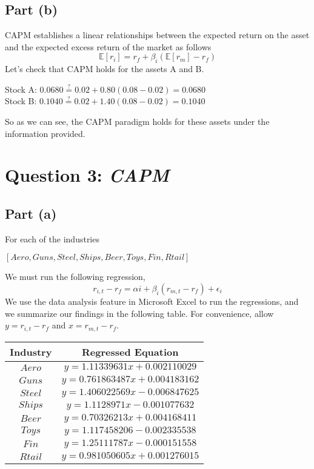 \documentclass[12pt]{article}
\begin{document}
	\subsection{Part (b)}
	
		CAPM establishes a linear relationships between the expected return on the asset and the expected excess return of the market as follows
		$$ \mathbb{E}[r_{i}] = r_{f} + \beta_{i}(\mathbb{E}[r_{m}] - r_{f}) $$
		Let's check that CAPM holds for the assets A and B.\\
		\begin{center}
		Stock A: $0.0680 \stackrel{?}{=} 0.02 + 0.80(0.08-0.02) = 0.0680$ \\ 
		Stock B: $0.1040 \stackrel{?}{=} 0.02 + 1.40(0.08-0.02) = 0.1040$
		\end{center}
		So as we can see, the CAPM paradigm holds for these assets under the information provided. 
		
\section{Question 3: \textit{CAPM}}

	\subsection{Part (a)}
		
		For each of the industries
		\begin{center}
			$[Aero, Guns, Steel, Ships, Beer, Toys, Fin, Rtail]$
		\end{center}
		We must run the following regression,
		$$ r_{i,t} - r_{f} = \alpha{i} + \beta_{i}(r_{m,t} - r_{f}) + \epsilon_{i} $$
		We use the data analysis feature in Microsoft Excel to run the regressions, and we summarize our findings in the following table. For convenience,
		allow $y = r_{i,t} - r_{f}$ and $x = r_{m,t} - r_{f}$. 
		\begin{center}
 		\begin{tabular}{||c c||} 
 		\hline
 		 Industry &  Regressed Equation \\ [0.5ex] 
 		\hline \hline
 		$Aero$ & $y = 1.11339631x + 0.002110029$  \\ 
 		\hline
 		$Guns$ & $y = 0.761863487x + 0.004183162$ \\
 		\hline
 		$Steel$ & $y = 1.406022569x - 0.006847625$  \\
 		\hline
 		$Ships$ & $y = 1.1128971x - 0.001077632$  \\
 		\hline
 		$Beer$ & $y = 0.70326213x + 0.004168411$  \\
 		\hline
 		$Toys$ & $y = 1.117458206 - 0.002335538$ \\
 		\hline
 		$Fin$ & $y = 1.25111787x - 0.000151558$ \\
 		\hline
 		$Rtail$ & $y = 0.981050605x + 0.001276015$ \\ 
 		\hline
		\end{tabular}
		\end{center}
		
\end{document}
